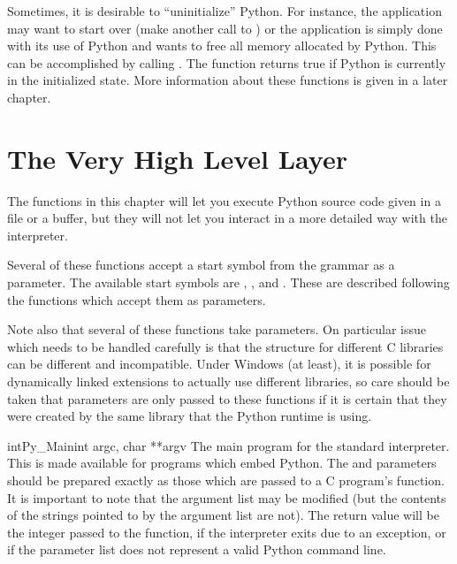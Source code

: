 \documentclass{manual}
\begin{document}
Sometimes, it is desirable to ``uninitialize'' Python.  For instance, 
the application may want to start over (make another call to 
) or the application is simply done with its 
use of Python and wants to free all memory allocated by Python.  This
can be accomplished by calling .  The function
 returns
true if Python is currently in the initialized state.  More
information about these functions is given in a later chapter.


\chapter{The Very High Level Layer \label{veryhigh}}

The functions in this chapter will let you execute Python source code
given in a file or a buffer, but they will not let you interact in a
more detailed way with the interpreter.

Several of these functions accept a start symbol from the grammar as a 
parameter.  The available start symbols are ,
, and .  These are
described following the functions which accept them as parameters.

Note also that several of these functions take 
parameters.  On particular issue which needs to be handled carefully
is that the  structure for different C libraries can be
different and incompatible.  Under Windows (at least), it is possible
for dynamically linked extensions to actually use different libraries,
so care should be taken that  parameters are only passed
to these functions if it is certain that they were created by the same
library that the Python runtime is using.

\begin{cfuncdesc}{int}{Py_Main}{int argc, char **argv}
  The main program for the standard interpreter.  This is made
  available for programs which embed Python.  The  and
   parameters should be prepared exactly as those which are
  passed to a C program's  function.  It is
  important to note that the argument list may be modified (but the
  contents of the strings pointed to by the argument list are not).
  The return value will be the integer passed to the
   function,  if the interpreter exits
  due to an exception, or  if the parameter list does not
  represent a valid Python command line.
\end{cfuncdesc}
\end{document}
